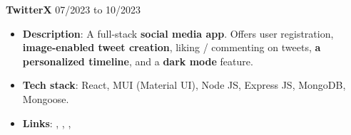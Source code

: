 \textbf{\large TwitterX} \hfill 07/2023 to 10/2023

\vspace{3pt}
\begin{itemize}[noitemsep, topsep=0pt, partopsep=0pt, parsep=4pt]
    \item \textbf{Description}: A full-stack \textbf{social media app}. Offers user registration, \textbf{image-enabled tweet creation},
liking / commenting on tweets, \textbf{a personalized timeline}, and a \textbf{dark mode} feature.
    \item \textbf{Tech stack}: React, MUI (Material UI), Node JS, Express JS, MongoDB, Mongoose.
    \item \textbf{Links}: 
    ,
    , 
    , 

\end{itemize}